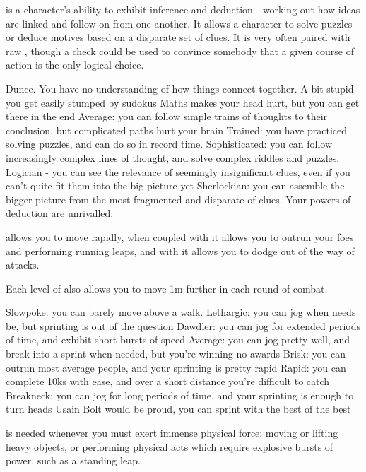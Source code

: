 
 is a character's ability to exhibit inference and deduction - working out how ideas are linked and follow on from one another. It allows a character to solve puzzles or deduce motives based on a disparate set of clues. It is very often paired with raw , though a  check could be used to convince somebody that a given course of action is the only logical choice. 

\ratingTable
{Dunce. You have no understanding of how things connect together.}
{A bit stupid - you get easily stumped by sudokus}
{Maths makes your head hurt, but you can get there in the end}
{Average: you can follow simple trains of thoughts to their conclusion, but complicated paths hurt your brain}
{Trained: you have practiced solving puzzles, and can do so in record time.}
{Sophisticated: you can follow increasingly complex lines of thought, and solve complex riddles and puzzles.}
{Logician - you can see the relevance of seemingly insignificant clues, even if you can't quite fit them into the big picture yet}
{Sherlockian: you can assemble the bigger picture from the most fragmented and disparate of clues. Your powers of deduction are unrivalled.}


 allows you to move rapidly, when coupled with  it allows you to outrun your foes and performing running leaps, and with  it allows you to dodge out of the way of attacks. 

Each level of  also allows you to move 1m further in each round of combat.
 
 \ratingTable
 {Slowpoke: you can barely move above a walk.}
 {Lethargic: you can jog when needs be, but sprinting is out of the question}
 {Dawdler: you can jog for extended periods of time, and exhibit short bursts of speed}
 {Average: you can jog pretty well, and break into a sprint when needed, but you're winning no awards}
 {Brisk: you can outrun most average people, and your sprinting is pretty rapid}
 {Rapid: you can complete 10ks with ease, and over a short distance you're difficult to catch}
 {Breakneck: you can jog for long periods of time, and your sprinting is enough to turn heads}
 {Usain Bolt would be proud, you can sprint with the best of the best}



 is needed whenever you must exert immense physical force: moving or lifting heavy objects, or performing physical acts which require explosive bursts of power, such as a standing leap. 



